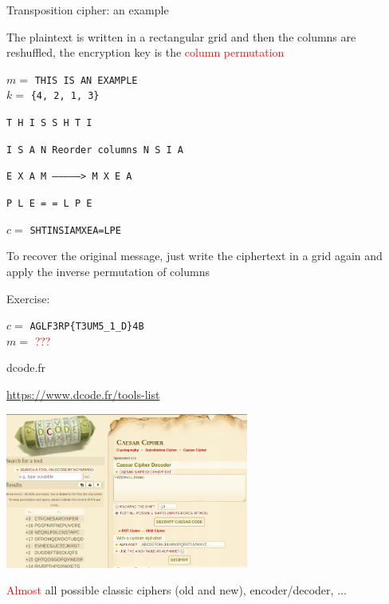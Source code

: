 \begin{frame}{Transposition cipher: an example}

The plaintext is written in a rectangular grid and then the columns are reshuffled, the encryption key is the \textcolor{red}{column permutation}

\medskip

\phantom{pad}$m =$ \texttt{THIS IS AN EXAMPLE}\\
\phantom{pad}$k =$ \texttt{\{4, 2, 1, 3\}}

\medskip

\centerline{\texttt{T H I S  \phantom{-------------------->} S H T I}}
\centerline{\texttt{I S A N  \phantom{---}Reorder columns\phantom{---} N S I A}}
\centerline{\texttt{E X A M  \phantom{---}-------------->\phantom{---} M X E A}}
\centerline{\texttt{P L E =  \phantom{-------------------->} = L P E}}

\medskip

\phantom{pad}$c =$ \texttt{SHTINSIAMXEA=LPE}

\medskip

To recover the original message, just write the ciphertext in a grid again and apply the inverse permutation of columns

\medskip

Exercise:

  \phantom{pad}$c =$ \texttt{AGLF3RP\{T3UM5\_1\_D\}4B}\\
  \phantom{pad}$m =$ \textcolor{red}{???}
  
\end{frame}
\begin{frame}{dcode.fr}

\centering

\href{https://www.dcode.fr/tools-list}{https://www.dcode.fr/tools-list}

\medskip

\includegraphics[width=8cm]{img/dcode.png}

\medskip

\textcolor{red}{Almost} all possible classic ciphers (old and new), encoder/decoder, ...

\end{frame}

